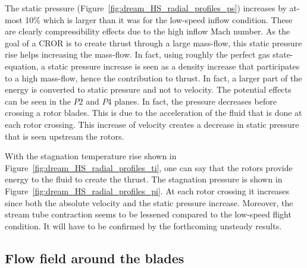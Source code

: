The static pressure (Figure~\ref{fig:dream_HS_radial_profiles_ps}) increases
by at-most 10\% which is larger than it was for the low-speed
inflow condition. These are clearly compressibility effects due
to the high inflow Mach number. As the goal of a CROR is
to create thrust through a large mass-flow, this
static pressure rise helps increasing the mass-flow.
In fact, using roughly the perfect gas state-equation,
a static pressure increase is seen as a density increase that
participates to a high mass-flow, hence the contribution to thrust.
In fact, a larger part of the energy is converted to static
pressure and not to velocity. The potential effects can be seen in the
$P2$ and $P4$ planes. In fact, the pressure decreases before
crossing a rotor blades. This is due to the acceleration of the
fluid that is done at each rotor crossing. This increase of velocity
creates a decrease in static pressure that is seen upstream the rotors.

With the stagnation temperature rise shown
in Figure~\ref{fig:dream_HS_radial_profiles_ti}, one can say that
the rotors provide energy to the fluid to create the thrust.
The stagnation pressure is shown in Figure~\ref{fig:dream_HS_radial_profiles_pi}.
At each rotor crossing it increases since both the absolute velocity and
the static pressure increase. 
Moreover, the stream tube contraction seems to be lessened
compared to the low-speed flight condition. It will have to be
confirmed by the forthcoming unsteady results.

\subsection{Flow field around the blades}
\label{sub:dream_hs_blades}

